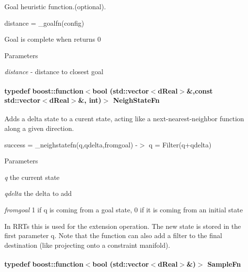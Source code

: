 Goal heuristic function.(optional). 

distance = \_\-goalfn(config)

Goal is complete when returns 0 
\begin{DoxyParams}{Parameters}
\item[{\em distance}]-\/ distance to closest goal \end{DoxyParams}
\hypertarget{classOpenRAVE_1_1PlannerBase_1_1PlannerParameters_a602e68d3c6c25efa6539bbd8b5e02c39}{
\paragraph[{NeighStateFn}]{\setlength{\rightskip}{0pt plus 5cm}typedef boost::function$<$bool (std::vector$<$dReal$>$\&,const std::vector$<$dReal$>$\&, int)$>$ {\bf NeighStateFn}}\hfill}
\label{classOpenRAVE_1_1PlannerBase_1_1PlannerParameters_a602e68d3c6c25efa6539bbd8b5e02c39}


Adds a delta state to a curent state, acting like a next-\/nearest-\/neighbor function along a given direction. 

success = \_\-neighstatefn(q,qdelta,fromgoal) -\/$>$ q = Filter(q+qdelta) 
\begin{DoxyParams}{Parameters}
\item[{\em q}]the current state \item[{\em qdelta}]the delta to add \item[{\em fromgoal}]1 if q is coming from a goal state, 0 if it is coming from an initial state\end{DoxyParams}
In RRTs this is used for the extension operation. The new state is stored in the first parameter q. Note that the function can also add a filter to the final destination (like projecting onto a constraint manifold). \hypertarget{classOpenRAVE_1_1PlannerBase_1_1PlannerParameters_a1b5ac1fcfcc5e5775ffbbc9c451541fd}{
\paragraph[{SampleFn}]{\setlength{\rightskip}{0pt plus 5cm}typedef boost::function$<$bool (std::vector$<$dReal$>$\&)$>$ {\bf SampleFn}}\hfill}
\label{classOpenRAVE_1_1PlannerBase_1_1PlannerParameters_a1b5ac1fcfcc5e5775ffbbc9c451541fd}


